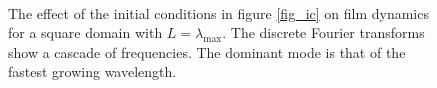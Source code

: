 \documentclass[a4paper,12pt]{article}
\begin{document}
  \begin{figure} 
   \centering
     \\
   \caption{The effect of the initial conditions in figure \ref{fig_ic} on film dynamics for a square domain with $L=\lambda_\text{max}$. The discrete Fourier transforms show a cascade of frequencies. The dominant mode is that of the fastest growing wavelength.}
   \label{fig_ic_effect}
  \end{figure}
\end{document}

